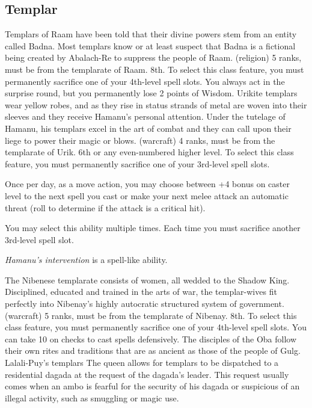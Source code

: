 \subsection{Templar}
{Templars of Raam have been told that their divine powers stem from an entity called Badna. Most templars know or at least suspect that Badna is a fictional being created by Abalach-Re to suppress the people of Raam.}
{ (religion) 5 ranks, must be from the templarate of Raam.}
{8th.}
{To select this class feature, you must permanently sacrifice one of your 4th-level spell slots.}
{
	You always act in the surprise round, but you permanently lose 2 points of Wisdom.
}
{Urikite templars wear yellow robes, and as they rise in status strands of metal are woven into their sleeves and they receive Hamanu's personal attention. Under the tutelage of Hamanu, his templars excel in the art of combat and they can call upon their liege to power their magic or blows.}
{ (warcraft) 4 ranks, must be from the templarate of Urik.}
{6th or any even-numbered higher level.}
{To select this class feature, you must permanently sacrifice one of your 3rd-level spell slots.}
{
	Once per day, as a move action, you may choose between +4 bonus on caster level to the next spell you cast or make your next melee attack an automatic threat (roll to determine if the attack is a critical hit).

	You may select this ability multiple times. Each time you must sacrifice another 3rd-level spell slot.

	\emph{Hamanu's intervention} is a spell-like ability.
}
{The Nibenese templarate consists of women, all wedded to the Shadow King. Disciplined, educated and trained in the arts of war, the templar-wives fit perfectly into Nibenay's highly autocratic structured system of government.}
{ (warcraft) 5 ranks, must be from the templarate of Nibenay.}
{8th.}
{To select this class feature, you must permanently sacrifice one of your 4th-level spell slots.}
{
	You can take 10 on  checks to cast spells defensively.
}
{The disciples of the Oba follow their own rites and traditions that are as ancient as those of the people of Gulg. Lalali-Puy's templars  The queen allows for templars to be dispatched to a residential dagada at the request of the dagada's leader. This request usually comes when an ambo is fearful for the security of his dagada or suspicious of an illegal activity, such as smuggling or magic use.}
